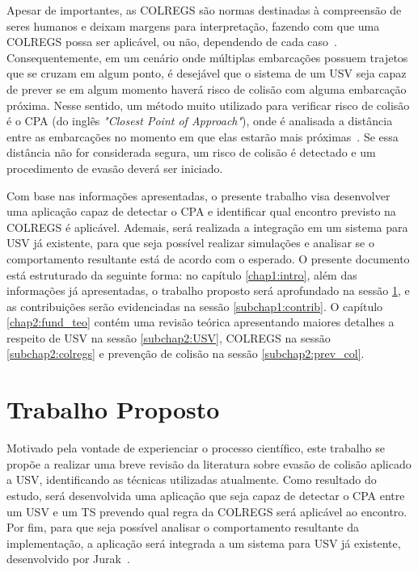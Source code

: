     Apesar de importantes, as COLREGS são normas destinadas à compreensão de seres humanos e deixam margens para interpretação, fazendo com que uma COLREGS possa ser aplicável, ou não, dependendo de cada caso~\cite{KUWATA2014110}. Consequentemente, em um cenário onde múltiplas embarcações possuem trajetos que se cruzam em algum ponto, é desejável que o sistema de um USV seja capaz de prever se em algum momento haverá risco de colisão com alguma embarcação próxima. Nesse sentido, um método muito utilizado para verificar risco de colisão é o CPA (do inglês \textit{"Closest Point of Approach"}), onde é analisada a distância entre as embarcações no momento em que elas estarão mais próximas~\cite{HUANG2019142}. Se essa distância não for considerada segura, um risco de colisão é detectado e um procedimento de evasão deverá ser iniciado.
    
    Com base nas informações apresentadas, o presente trabalho visa desenvolver uma aplicação capaz de detectar o CPA e identificar qual encontro previsto na COLREGS é aplicável. Ademais, será realizada a integração em um sistema para USV já existente, para que seja possível realizar simulações e analisar se o comportamento resultante está de acordo com o esperado. O presente documento está estruturado da seguinte forma: no capítulo \ref{chap1:intro}, além das informações já apresentadas, o trabalho proposto será aprofundado na sessão \ref{subchap1:trab_prop}, e as contribuições serão evidenciadas na sessão \ref{subchap1:contrib}. O capítulo \ref{chap2:fund_teo} contém uma revisão teórica apresentando maiores detalhes a respeito de USV na sessão \ref{subchap2:USV}, COLREGS na sessão \ref{subchap2:colregs} e prevenção de colisão na sessão \ref{subchap2:prev_col}.
    
    \section{Trabalho Proposto}\label{subchap1:trab_prop}
        Motivado pela vontade de experienciar o processo científico, este trabalho se propõe a realizar uma breve revisão da literatura sobre evasão de colisão aplicado a USV, identificando as técnicas utilizadas atualmente. Como resultado do estudo, será desenvolvida uma aplicação que seja capaz de detectar o CPA entre um USV e um TS prevendo qual regra da COLREGS será aplicável ao encontro. Por fim, para que seja possível analisar o comportamento resultante da implementação, a aplicação será integrada a um sistema para USV já existente, desenvolvido por Jurak~\cite{JURAK2020}.
        
